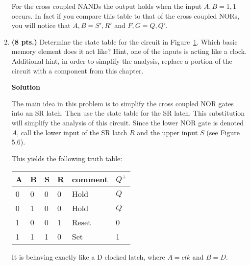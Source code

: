\begin{enumerate}
\begin{onlysolution}
{                For the cross coupled NANDs the output holds when the input $A,B=1,1$ occurs.
                In fact if you compare this table to that of the cross coupled NORs, you will
                notice that $A,B = S',R'$ and $F,G = Q,Q'$.
            }
        \end{onlysolution}

    \item \textbf{ (8 pts.)} Determine the state table for the circuit
        in Figure~\ref{fig:sequentialCirDLatch}.  Which basic memory element does it act
        like?  Hint, one of the inputs is acting like a clock.  Additional
        hint, in order to simplify the analysis, replace a portion of the
        circuit with a component from this chapter.
        \begin{figure}[ht]
            \caption{}
            \label{fig:sequentialCirDLatch}
        \end{figure}

        \begin{onlysolution}  \textbf{Solution} \itshape{
                The main idea in this problem is to simplify the cross coupled NOR gates into
                an SR latch.  Then use the state table for the SR latch.  This substitution
                will simplify the analysis of this circuit.  Since the lower NOR gate is denoted
                $A$, call the lower input of the SR latch $R$ and the upper input $S$
                (see Figure 5.6).

                This yields the following truth table:

                \begin{tabular}{l|l|l|l|l||l}
                    A & B & S & R & comment & $Q^+$ \\ \hline
                    0 & 0 & 0 & 0 & Hold    & $Q$   \\ \hline
                    0 & 1 & 0 & 0 & Hold    & $Q$   \\ \hline
                    1 & 0 & 0 & 1 & Reset   & 0     \\ \hline
                    1 & 1 & 1 & 0 & Set     & 1     \\
                \end{tabular}

                It is behaving exactly like a D clocked latch, where $A=clk$ and $B=D$.
            }
        \end{onlysolution}


\end{enumerate}

